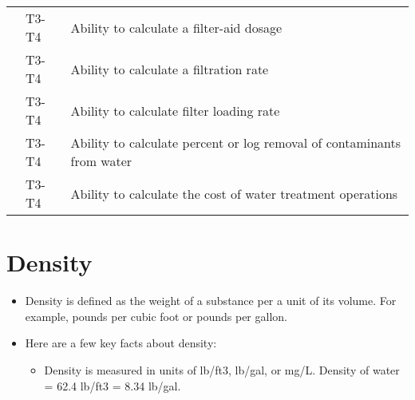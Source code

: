 \begin{table}[H]
\begin{tabular}{| m{1cm} | m{1cm} | m{12cm} |}
\multicolumn{1}{l|}{} & \multicolumn{1}{l|}{T3-T4} & Ability to calculate   a filter-aid dosage                                   \\ \cline{2-3} 
\multicolumn{1}{l|}{} & \multicolumn{1}{l|}{T3-T4} & Ability to calculate   a filtration rate                                     \\ \cline{2-3} 
\multicolumn{1}{l|}{} & \multicolumn{1}{l|}{T3-T4} & Ability to calculate   filter loading rate                                   \\ \cline{2-3} 
\multicolumn{1}{l|}{} & \multicolumn{1}{l|}{T3-T4} & Ability to calculate   percent or log removal of contaminants from water     \\ \cline{2-3} 
\multicolumn{1}{l|}{} & \multicolumn{1}{l|}{T3-T4} & Ability to calculate   the cost of water treatment operations                \\ \cline{2-3} 
\end{tabular}
\end{table}
\newpage


\section{Density}
\begin{itemize}
\item Density is defined as the weight of a substance per a unit of its volume. For example, pounds per cubic foot or pounds per gallon.

\item Here are a few key facts about density:
\begin{itemize}

\item Density is measured in units of lb/ft3, lb/gal, or mg/L. Density of water = 62.4 lb/ft3 = 8.34 lb/gal.
\end{itemize}
\end{itemize}


